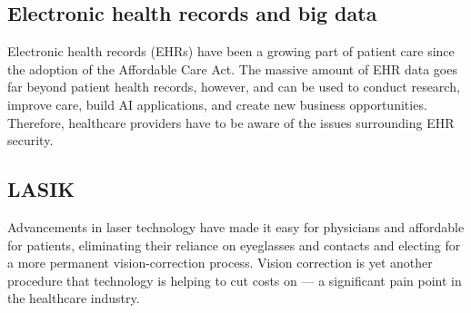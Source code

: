 \documentclass[12pt]{article}
\begin{document}
\subsection*{Electronic health records and big data}
Electronic health records (EHRs) have been a growing part of patient care since the adoption of the Affordable Care Act. The massive amount of EHR data goes far beyond patient health records, however, and can be used to conduct research, improve care, build AI applications, and create new business opportunities. Therefore, healthcare providers have to be aware of the issues surrounding EHR security.

\subsection*{ LASIK}
Advancements in laser technology have made it easy for physicians and affordable for patients, eliminating their reliance on eyeglasses and contacts and electing for a more permanent vision-correction process. Vision correction is yet another procedure that technology is helping to cut costs on — a significant pain point in the healthcare industry.
\end{document}

